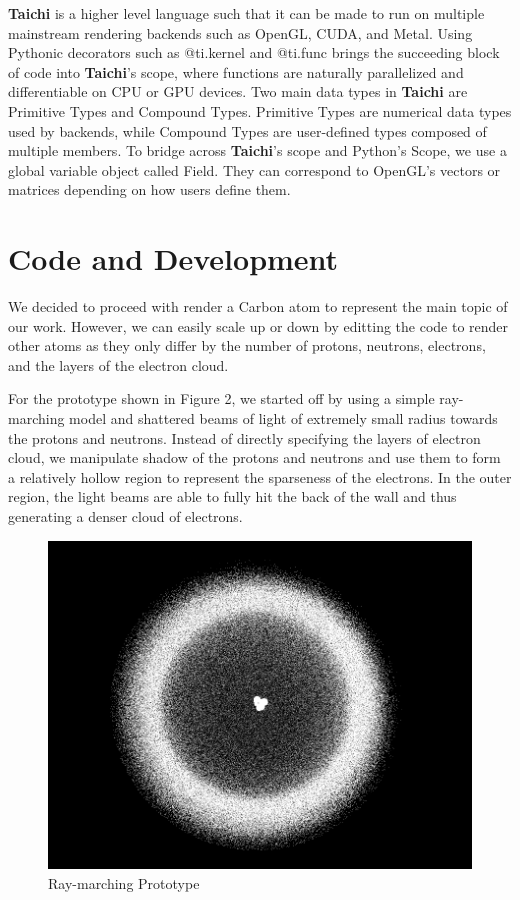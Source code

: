 \documentclass[acmtog]{acmart}
\begin{document}
\textbf{Taichi} is a higher level language such that it can be made to run on multiple mainstream rendering backends such as OpenGL, CUDA, and Metal. Using Pythonic decorators such as @ti.kernel and @ti.func brings the succeeding block of code into \textbf{Taichi}'s scope, where functions are naturally parallelized and differentiable on CPU or GPU devices. Two main data types in \textbf{Taichi} are Primitive Types and Compound Types. Primitive Types are numerical data types used by backends, while Compound Types are user-defined types composed of multiple members. To bridge across \textbf{Taichi}'s scope and Python's Scope, we use a global variable object called Field. They can correspond to OpenGL's vectors or matrices depending on how users define them.

\section{Code and Development}
We decided to proceed with render a Carbon atom to represent the main topic of our work. However, we can easily scale up or down by editting the code to render other atoms as they only differ by the number of protons, neutrons, electrons, and the layers of the electron cloud. 

For the prototype shown in Figure 2, we started off by using a simple ray-marching model and shattered beams of light of extremely small radius towards the protons and neutrons. Instead of directly specifying the layers of electron cloud, we manipulate shadow of the protons and neutrons and use them to form a relatively hollow region to represent the sparseness of the electrons. In the outer region, the light beams are able to fully hit the back of the wall and thus generating a denser cloud of electrons.

\begin{figure}[h]
  \centering
  \includegraphics[width=\linewidth]{./prototype.png}
  \caption{Ray-marching Prototype}
\end{figure}
\end{document}
